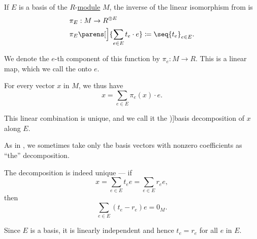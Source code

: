 \begin{definition}\label{def:basis_decomposition}\mimprovised
  If \( E \) is a basis of the \( R \)-\hyperref[def:module]{module} \( M \), the inverse of the linear isomorphism from  is
  \begin{equation*}
    \begin{aligned}
      &\pi_E: M \to R^{\oplus E} \\
      &\pi_E\parens[\Big]{ \sum_{e \in E} t_e \cdot e } \coloneqq \seq{ t_e }_{e \in E}.
    \end{aligned}
  \end{equation*}

  We denote the \( e \)-th component of this function by \( \pi_e: M \to R \). This is a linear map, which we call the  onto \( e \).

  For every vector \( x \) in \( M \), we thus have
  \begin{equation*}
    x = \sum_{e \in E} \pi_e(x) \cdot e.
  \end{equation*}

  This linear combination is unique, and we call it the \term[ru=разложение по базису (\cite[sec. 12.1]{Тыртышников2007ЛинейнаяАлгебра})]{basis decomposition} of \( x \) along \( E \).
\end{definition}
\begin{comments}
  \item As in , we sometimes take only the basis vectors with nonzero coefficients as \enquote{the} decomposition.
\end{comments}
\begin{defproof}
  The decomposition is indeed unique --- if
  \begin{equation*}
    x = \sum_{e \in E} t_e e = \sum_{e \in E} r_e e,
  \end{equation*}
  then
  \begin{equation*}
    \sum_{e \in E} (t_e - r_e) e = 0_M.
  \end{equation*}

  Since \( E \) is a basis, it is linearly independent and hence \( t_e = r_e \) for all \( e \) in \( E \).
\end{defproof}


